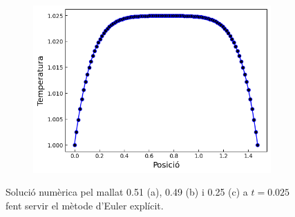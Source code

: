 \documentclass{article}
\begin{document}
\begin{figure}[h]
\begin{subfigure}[b]{0.32\textwidth}
        \includegraphics[width=\textwidth]{images/T_vs_z_at3.png}
        \caption{} 
        \label{fig:euler_exp_at3}
    \end{subfigure}
    \caption{Solució numèrica pel mallat 0.51 (a), 0.49 (b) i 0.25 (c) a $t=0.025$ fent servir el mètode d'Euler explícit.}
    \label{fig:euler_explicit}
\end{figure}
\end{document}
